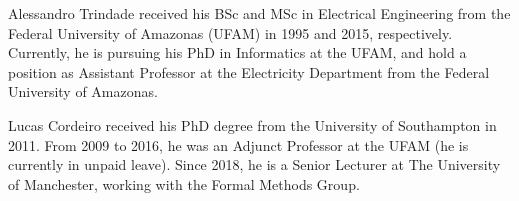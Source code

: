 \documentclass[journal]{IEEEtran}
\begin{document}

% 

\begin{IEEEbiographynophoto}{Alessandro Trindade}
received his BSc and MSc in Electrical Engineering from the Federal University of Amazonas (UFAM) in 1995 and 2015, respectively. Currently, he is pursuing his PhD in Informatics at the UFAM, and hold a position as Assistant Professor at the Electricity Department from the Federal University of Amazonas.
\end{IEEEbiographynophoto}

\begin{IEEEbiographynophoto}{Lucas Cordeiro}
received his PhD degree from the University of Southampton in 2011. From 2009 to 2016, he was an Adjunct Professor at the UFAM (he is currently in unpaid leave). Since 2018, he is a Senior Lecturer at The University of Manchester, working with the Formal Methods Group.
\end{IEEEbiographynophoto}








\end{document}

